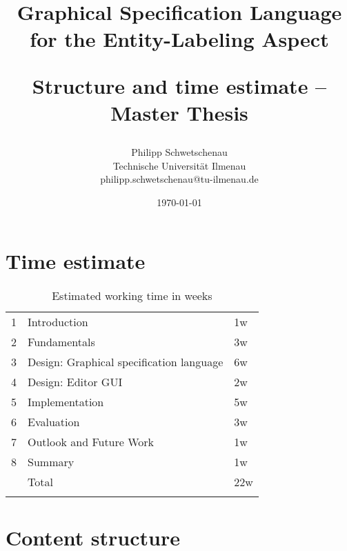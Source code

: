 \documentclass[12pt,a4paper]{article}
\begin{document}
\title{{\bf Graphical Specification Language \\for the Entity-Labeling Aspect} \\ 
\begin{large}Structure and time estimate -- Master Thesis\end{large}
}
\author{
	Philipp Schwetschenau \\
	Technische Universität Ilmenau \\
	philipp.schwetschenau@tu-ilmenau.de
}
\date{\today}

\maketitle

\section{Time estimate} 
\begin{table}[h]
   \begin{tabularx}{\textwidth}{p{1cm} X p{5cm}} \toprule
   1 	& Introduction 							& 1w 	\\ 
   2 	& Fundamentals 							& 3w	\\
   3 	& Design: Graphical specification language 	& 6w	\\
   4 	& Design: Editor GUI 						& 2w	\\
   5 	& Implementation 						& 5w	\\
   6 	& Evaluation 								& 3w	\\
   7 	& Outlook and Future Work 				& 1w	\\
   8 	& Summary 								& 1w	\\	
   	& Total									& 22w 	\\ \bottomrule
    \\ 
  \end{tabularx}
  \caption{Estimated working time in weeks}
 \end{table}
  
\cleardoublepage

\section{Content structure}
\end{document}
